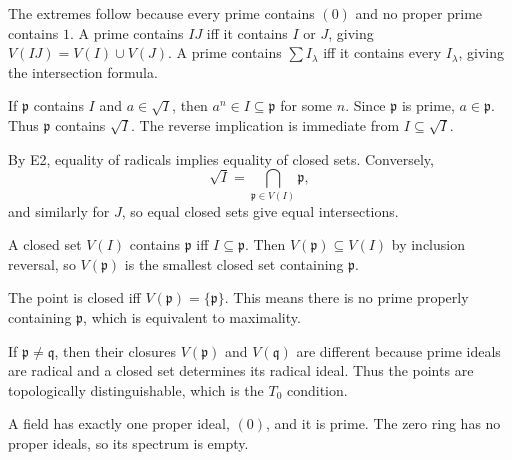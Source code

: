 \begin{solution}[VI.07.E1]
The extremes follow because every prime contains $(0)$ and no proper prime contains $1$.
A prime contains $IJ$ iff it contains $I$ or $J$, giving $V(IJ)=V(I)\cup V(J)$.
A prime contains $\sum I_\lambda$ iff it contains every $I_\lambda$, giving the intersection formula.
\end{solution}

\begin{solution}[VI.07.E2]
If $\mathfrak p$ contains $I$ and $a\in\sqrt I$, then $a^n\in I\subseteq\mathfrak p$ for some $n$.
Since $\mathfrak p$ is prime, $a\in\mathfrak p$.  Thus $\mathfrak p$ contains $\sqrt I$.
The reverse implication is immediate from $I\subseteq\sqrt I$.
\end{solution}

\begin{solution}[VI.07.E3]
By E2, equality of radicals implies equality of closed sets. Conversely,
\[
\sqrt I=\bigcap_{\mathfrak p\in V(I)}\mathfrak p,
\]
and similarly for $J$, so equal closed sets give equal intersections.
\end{solution}

\begin{solution}[VI.07.E4]
A closed set $V(I)$ contains $\mathfrak p$ iff $I\subseteq\mathfrak p$.  Then
$V(\mathfrak p)\subseteq V(I)$ by inclusion reversal, so $V(\mathfrak p)$ is the smallest
closed set containing $\mathfrak p$.
\end{solution}

\begin{solution}[VI.07.E5]
The point is closed iff $V(\mathfrak p)=\{\mathfrak p\}$.  This means there is no prime
properly containing $\mathfrak p$, which is equivalent to maximality.
\end{solution}

\begin{solution}[VI.07.E6]
If $\mathfrak p\neq\mathfrak q$, then their closures $V(\mathfrak p)$ and $V(\mathfrak q)$
are different because prime ideals are radical and a closed set determines its radical ideal.
Thus the points are topologically distinguishable, which is the $T_0$ condition.
\end{solution}

\begin{solution}[VI.07.E7]
A field has exactly one proper ideal, $(0)$, and it is prime.  The zero ring has no proper
ideals, so its spectrum is empty.
\end{solution}

